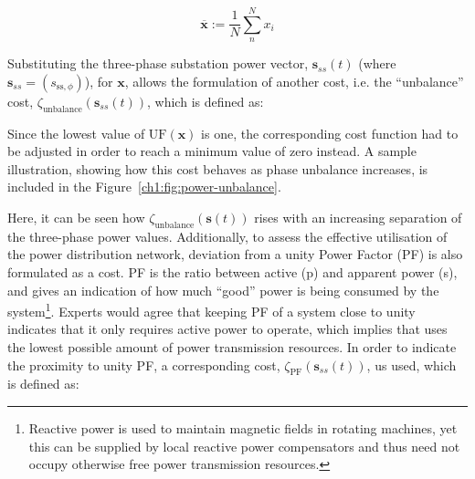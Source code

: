 \begin{equation}
	\overline{\textbf{x}} := \frac{1}{N}\sum_n^N{x_i}
\end{equation}


Substituting the three-phase substation power vector, $\textbf{s}_{ss}(t)$ (where $\textbf{s}_{ss} = (s_{\text{ss},\phi})$), for $\textbf{x}$, allows the formulation of another cost, i.e. the ``unbalance'' cost, $\zeta_\text{unbalance}(\textbf{s}_{ss}(t))$, which is defined as:



Since the lowest value of $\text{UF}(\textbf{x})$ is one, the corresponding cost function had to be adjusted in order to reach a minimum value of zero instead.
A sample illustration, showing how this cost behaves as phase unbalance increases, is included in the Figure~\ref{ch1:fig:power-unbalance}.




Here, it can be seen how $\zeta_\text{unbalance}(\textbf{s}(t))$ rises with an increasing separation of the three-phase power values.
Additionally, to assess the effective utilisation of the power distribution network, deviation from a unity Power Factor (PF) is also formulated as a cost.
PF is the ratio between active (p) and apparent power (s), and gives an indication of how much ``good'' power is being consumed by the system\footnote{Reactive power is used to maintain magnetic fields in rotating machines, yet this can be supplied by local reactive power compensators and thus need not occupy otherwise free power transmission resources.}.
Experts would agree that keeping PF of a system close to unity indicates that it only requires active power to operate, which implies that uses the lowest possible amount of power transmission resources.
In order to indicate the proximity to unity PF, a corresponding cost, $\zeta_\text{PF}(\textbf{s}_{ss}(t))$, us used, which is defined as:



